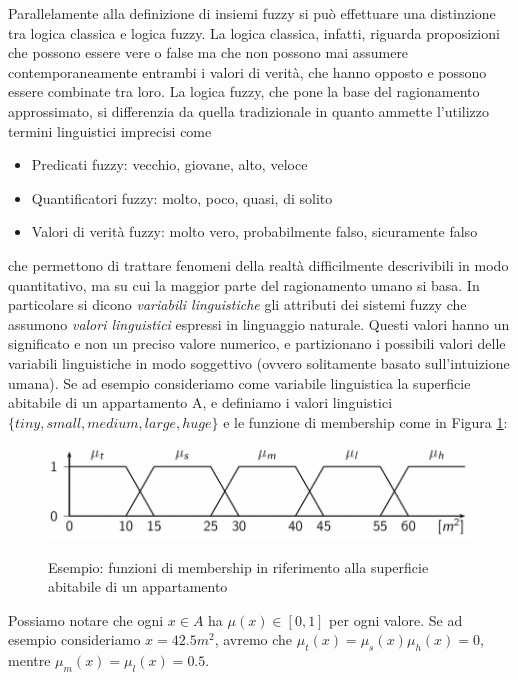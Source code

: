 \documentclass[oneside, openany]{book}
\begin{document}
		Parallelamente alla definizione di insiemi fuzzy si può effettuare una distinzione tra logica classica e logica fuzzy. La logica classica, infatti, riguarda proposizioni che possono essere vere o false ma che non possono mai assumere contemporaneamente entrambi i valori di verità, che hanno opposto e possono essere combinate tra loro.
		La logica fuzzy, che pone la base del ragionamento approssimato, si differenzia da quella tradizionale in quanto ammette l'utilizzo termini linguistici imprecisi come
		\begin{itemize}
			\item{Predicati fuzzy}: vecchio, giovane, alto, veloce
			\item{Quantificatori fuzzy}: molto, poco, quasi, di solito
			\item{Valori di verità fuzzy}: molto vero, probabilmente falso, sicuramente falso
		\end{itemize}	
		che permettono di trattare fenomeni della realtà difficilmente descrivibili in modo quantitativo, ma su cui la maggior parte del ragionamento umano si basa.
		In particolare si dicono \textit{variabili linguistiche} gli attributi dei sistemi fuzzy che assumono \textit{valori linguistici} espressi in linguaggio naturale. Questi valori hanno un significato e non un preciso valore numerico, e partizionano i possibili valori delle variabili linguistiche in modo soggettivo (ovvero solitamente basato sull'intuizione umana).
		Se ad esempio consideriamo come variabile linguistica la superficie abitabile di un appartamento A, e definiamo i valori linguistici $\{tiny, small, medium, large, huge\}$ e le funzione di membership come in Figura \ref{fig:mem2}:
		
		\begin{figure}[h]
			\centering
			{\includegraphics[width=.80\textwidth]{mem2.png}} \quad
			\caption{Esempio: funzioni di membership in riferimento alla superficie abitabile di un appartamento}
			\label{fig:mem2}
		\end{figure}
		Possiamo notare che ogni $x \in A$ ha $\mu(x) \in [0,1]$ per ogni valore. Se ad esempio consideriamo $x=42.5m^2$, avremo che $\mu_t(x)=\mu_s(x)\mu_h(x)=0$, mentre $\mu_m(x)=\mu_l(x)=0.5$.
		\\
		 
\end{document}
